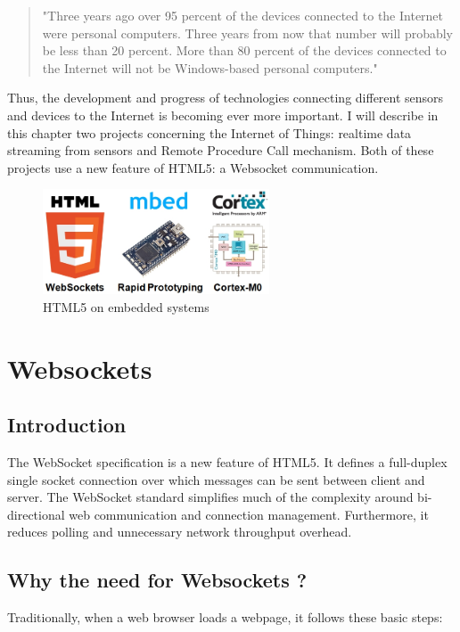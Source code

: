 \documentclass[pdftex,10pt,a4paper]{report}
\begin{document}
\begin{quote} "Three years ago over 95 percent of the devices connected to the Internet were personal computers. Three years from now that number will probably be less than 20 percent. More than 80 percent of the devices connected to the Internet will not be Windows-based personal computers." \\
\end{quote}

Thus, the development and progress of technologies connecting different sensors and devices to the Internet is becoming ever more important. I will describe in this chapter two projects concerning the Internet of Things: realtime data streaming from sensors and Remote Procedure Call mechanism. Both of these projects use a new feature of HTML5: a Websocket communication.


\begin{figure}[h!]
		\centering
		\includegraphics[width=0.6\textwidth]{./logo_ws.jpg}
		\caption{HTML5 on embedded systems}
		\label{HTML5 on embedded systems}
\end{figure}

\section{Websockets}
\subsection{Introduction}
The WebSocket specification is a new feature of HTML5. It defines a full-duplex single socket connection over which messages can be sent between client and server. The WebSocket standard simplifies much of the complexity around bi-directional web communication and connection management. Furthermore, it reduces polling and unnecessary network throughput overhead.

\subsection{Why the need for Websockets ?}
Traditionally, when a web browser loads a webpage, it follows these basic steps:
\end{document}
